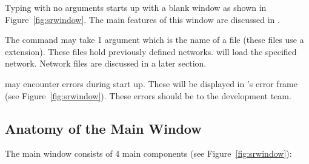 Typing  with no arguments starts up \sr{} with a blank \sr{}
window as shown in Figure~\ref{fig:srwindow}.  The main features of this
window are discussed in .

The  command may take 1 argument
which is the name of a \sr{}   file (these
files use a  extension).  These files hold previously
defined \sr{} networks.  \sr{} will load the specified network.  Network
files are discussed in a later section.

\sr{} may encounter errors during start up.  These will be displayed in
\sr{}'s error frame (see Figure~\ref{fig:srwindow}).  These errors
should be  to the \sr{} development
team.  

\subsection{Anatomy of the Main Window}
\label{sec:windowanatomy}

The \sr{} main window consists of 4 main components (see
Figure~\ref{fig:srwindow}): 


